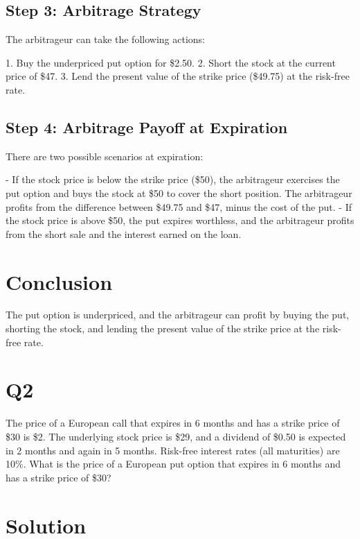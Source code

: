 \documentclass[12pt,letterpaper, onecolumn]{exam}
\begin{document}
\subsection*{Step 3: Arbitrage Strategy}

The arbitrageur can take the following actions:

1. Buy the underpriced put option for \$2.50.
2. Short the stock at the current price of \$47.
3. Lend the present value of the strike price (\$49.75) at the risk-free rate.

\subsection*{Step 4: Arbitrage Payoff at Expiration}

There are two possible scenarios at expiration:

- If the stock price is below the strike price (\$50), the arbitrageur exercises the put option and buys the stock at \$50 to cover the short position. The arbitrageur profits from the difference between \$49.75 and \$47, minus the cost of the put.
- If the stock price is above \$50, the put expires worthless, and the arbitrageur profits from the short sale and the interest earned on the loan.

\section*{Conclusion}

The put option is underpriced, and the arbitrageur can profit by buying the put, shorting the stock, and lending the present value of the strike price at the risk-free rate.


    \newpage
    
\section*{Q2}

The price of a European call that expires in 6 months and has a strike price of \$30 is \$2. The underlying stock price is \$29, and a dividend of \$0.50 is expected in 2 months and again in 5 months. Risk-free interest rates (all maturities) are 10\%. What is the price of a European put option that expires in 6 months and has a strike price of \$30?

\section*{Solution}
\end{document}

